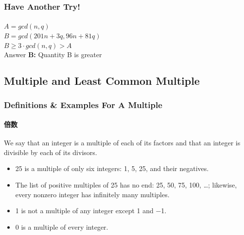 \documentclass[
	11pt, %
]{beamer}
\begin{document}

\begin{frame}
	\frametitle{Have Another Try!}
	\framesubtitle{}
	$A = gcd(n, q)$ \\
	
	\bigskip
  $B = gcd(201n + 3q, 96n + 81q)$ \\
\bigskip
\pause
$B \geq 3 \cdot gcd(n, q) > A$\\
Answer \textbf{B: } Quantity B is greater
\end{frame}


\subsection{Multiple and Least Common Multiple}


\begin{frame}
	\frametitle{Definitions \& Examples For A Multiple}
	\framesubtitle{倍数}
	\begin{definition}
		We say that an integer is a multiple of each of its factors and that an integer is
divisible by each of its divisors.
	\end{definition}
	
	\smallskip %
	
	\begin{example}
		\begin{itemize}
			\item 25 is a multiple of only six integers: 1, 5, 25, and their \alert{negatives}.
			\item The list of positive multiples of 25 has no end: 25, 50, 75, 100, …; likewise, every nonzero integer has infinitely many multiples.
			\item 1 is \alert{not} a multiple of any integer except 1 and −1.
			\item 0 is a multiple of every integer.
		\end{itemize}
	\end{example}
	
\end{frame}

\end{document}
